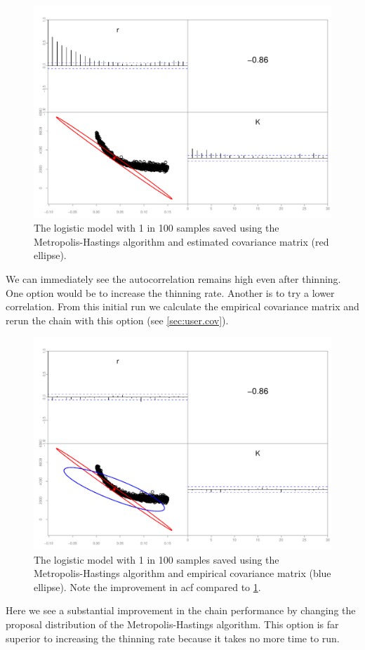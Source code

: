 \documentclass{article}\usepackage[]{graphicx}\usepackage[]{color}
\begin{document}
\begin{figure}[H]
  \centering
  \includegraphics[width=5in]{../plots/logistic_mh.pdf}
  \caption{The logistic model with 1 in 100 samples saved
    using the Metropolis-Hastings algorithm and estimated covariance matrix
    (red ellipse).}
  \label{fig:logistic_mh}
\end{figure}
We can immediately see the autocorrelation remains high even
after thinning. One option would be to increase the thinning
rate. Another is to try a lower correlation. From this
initial run we calculate the empirical covariance matrix and
rerun the chain with this option (see \ref{sec:user.cov}).

\begin{figure}[H]
  \centering
  \includegraphics[width=5in]{../plots/logistic_mh2.pdf}
  \caption{The logistic model with 1 in 100 samples saved
    using the Metropolis-Hastings algorithm and empirical covariance matrix
    (blue ellipse). Note the improvement in acf compared to
    \ref{fig:logistic_mh}.}
  \label{fig:logistic_mh2}
\end{figure}
Here we see a substantial improvement in the chain
performance by changing the proposal distribution of the
Metropolis-Hastings algorithm. This option is far superior
to increasing the thinning rate because it takes no more
time to run.
\end{document}
